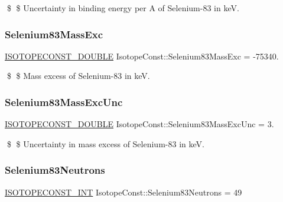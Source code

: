 \$ \$ Uncertainty in binding energy per A of Selenium-\/83 in keV. \mbox{\label{group___isotope_const-_selenium-_se83_ga52d84ae3ae4b31bd40b063fb2ecd815a}} 
\subsubsection{\texorpdfstring{Selenium83\+Mass\+Exc}{Selenium83MassExc}}
{\footnotesize\ttfamily \mbox{\hyperlink{group___isotope_const-_macros_ga8f45a7272ce02c0b4c65c44636ed719a}{I\+S\+O\+T\+O\+P\+E\+C\+O\+N\+S\+T\+\_\+\+D\+O\+U\+B\+LE}} Isotope\+Const\+::\+Selenium83\+Mass\+Exc = -\/75340.}

\$ \$ Mass excess of Selenium-\/83 in keV. \mbox{\label{group___isotope_const-_selenium-_se83_gaf73d7f5e787a381751eb379bee4894a1}} 
\subsubsection{\texorpdfstring{Selenium83\+Mass\+Exc\+Unc}{Selenium83MassExcUnc}}
{\footnotesize\ttfamily \mbox{\hyperlink{group___isotope_const-_macros_ga8f45a7272ce02c0b4c65c44636ed719a}{I\+S\+O\+T\+O\+P\+E\+C\+O\+N\+S\+T\+\_\+\+D\+O\+U\+B\+LE}} Isotope\+Const\+::\+Selenium83\+Mass\+Exc\+Unc = 3.}

\$ \$ Uncertainty in mass excess of Selenium-\/83 in keV. \mbox{\label{group___isotope_const-_selenium-_se83_ga85c926dd91fd992e26892ea1e2e30b2c}} 
\subsubsection{\texorpdfstring{Selenium83\+Neutrons}{Selenium83Neutrons}}
{\footnotesize\ttfamily \mbox{\hyperlink{group___isotope_const-_macros_ga5f18360b3e99483a35c32d789e62621c}{I\+S\+O\+T\+O\+P\+E\+C\+O\+N\+S\+T\+\_\+\+I\+NT}} Isotope\+Const\+::\+Selenium83\+Neutrons = 49}

